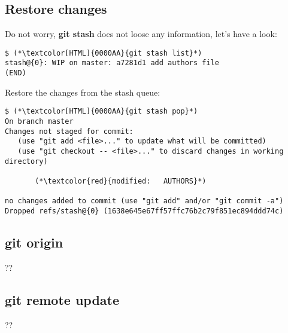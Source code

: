 \subsection{Restore changes}
\begin{frame}[fragile]
\subslidetitle

Do not worry, \textbf{git stash} does not loose any information, let's have a look:

\begin{lstlisting}
$ (*\textcolor[HTML]{0000AA}{git stash list}*)
stash@{0}: WIP on master: a7281d1 add authors file
(END)
\end{lstlisting}

Restore the changes from the stash queue:

\begin{lstlisting}
$ (*\textcolor[HTML]{0000AA}{git stash pop}*)
On branch master
Changes not staged for commit:
   (use "git add <file>..." to update what will be committed)
   (use "git checkout -- <file>..." to discard changes in working directory)

       (*\textcolor{red}{modified:   AUTHORS}*)

no changes added to commit (use "git add" and/or "git commit -a")
Dropped refs/stash@{0} (1638e645e67ff57ffc76b2c79f851ec894ddd74c)
\end{lstlisting}
\end{frame}

\subsection{git origin}
\begin{frame}[fragile]
  \subslidetitle
  ??
\end{frame}

\subsection{git remote update}
\begin{frame}[fragile]
  \subslidetitle
  ??
\end{frame}

